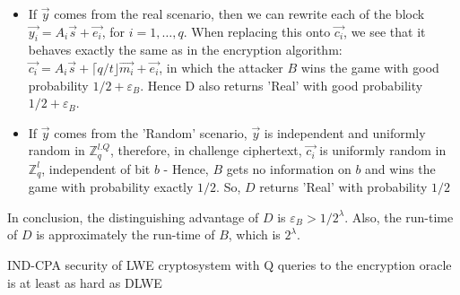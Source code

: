 \begin{description}
\begin{description}
\begin{itemize}
    \item If $\vec{y}$ comes from the real scenario, then we can rewrite each of
      the block $\vec{y_i} = A_i\vec{s} + \vec{e_i}$, for $i = 1,\dots,q$. When
      replacing this onto $\vec{c_i}$, we see that it behaves exactly the same
      as in the encryption algorithm:
      $\vec{c_i} = A_i\vec{s} + \lceil q/t \rfloor \vec{m_i} + \vec{e_i}$, in
      which the attacker $B$ wins the game with good probability
      $1/2 + \varepsilon_B$. Hence D also returns 'Real' with good probability
      $1/2 + \varepsilon_B$.
    \item If $\vec{y}$ comes from the 'Random' scenario, $\vec{y}$ is
      independent and uniformly random in $\mathbb{Z}_q^{l.Q}$, therefore, in
      challenge ciphertext, $\vec{c_i}$ is uniformly random in $\mathbb{Z}_q^l$,
      independent of bit $b$ - Hence, $B$ gets no information on $b$ and wins
      the game with probability exactly $1/2$. So, $D$ returns 'Real' with
      probability $1/2$
    \end{itemize}
    In conclusion, the distinguishing advantage of $D$ is
    $\varepsilon_B > 1/2^\lambda$. Also, the run-time of $D$ is approximately
    the run-time of $B$, which is $2^\lambda$.
    \begin{theorem}
      IND-CPA security of LWE cryptosystem with Q queries to the encryption
      oracle is at least as hard as DLWE
      \label{theo:reductionCPADLWE}
    \end{theorem}


  \end{description}


\end{description}

